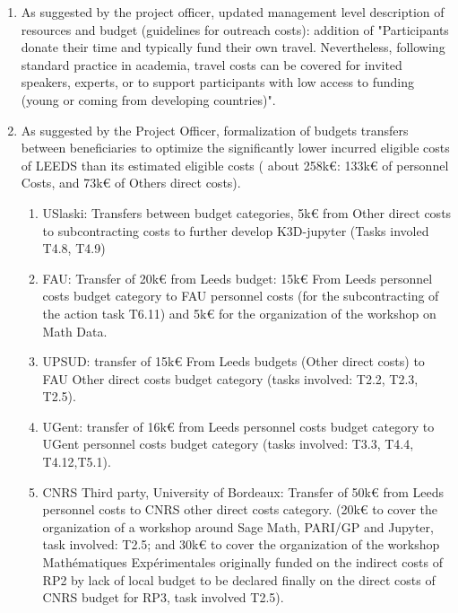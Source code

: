 \begin{enumerate}
\item As suggested by the project officer, updated management level description of resources and budget (guidelines for outreach costs): addition of "Participants donate their time and typically fund their own travel. Nevertheless, following standard practice in academia, travel costs can be covered for invited speakers, experts, or to support participants with low access to funding (young or coming from developing countries)".

\item As suggested by the Project Officer,  formalization of budgets transfers between beneficiaries to optimize the significantly lower incurred eligible costs of LEEDS than its estimated eligible costs ( about 258k€: 133k€ of personnel Costs, and 73k€ of Others direct costs). 

\begin{enumerate}
\item USlaski: Transfers between budget categories, 5k€ from Other direct costs to subcontracting costs to further develop K3D-jupyter (Tasks involed T4.8, T4.9)
\item FAU: Transfer of 20k€ from Leeds budget: 15k€ From Leeds personnel costs budget category to FAU personnel costs (for the subcontracting of the action task T6.11) and 5k€ for the organization of the workshop on Math Data.
\item UPSUD: transfer of 15k€ From Leeds budgets (Other direct costs) to FAU Other direct costs budget category (tasks involved: T2.2, T2.3, T2.5).
\item UGent: transfer of 16k€ from Leeds personnel costs budget category to UGent personnel costs budget category (tasks involved: T3.3, T4.4, T4.12,T5.1).
\item CNRS Third party, University of Bordeaux: Transfer of 50k€ from Leeds personnel costs to CNRS other direct costs category. (20k€ to cover the organization of a workshop around Sage Math, PARI/GP and Jupyter, task involved: T2.5; and 30k€ to cover the organization of the workshop Mathématiques Expérimentales originally funded on the indirect costs of RP2 by lack of local budget to be declared finally on the direct costs of CNRS budget for RP3, task involved T2.5).
\end{enumerate}
\end{enumerate}
